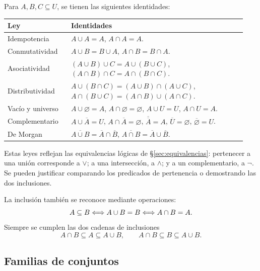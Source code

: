 Para $A,B,C\subseteq U$, se tienen las siguientes identidades:
\begin{center}
\small
\begin{tabular}{@{}p{0.25\linewidth}p{0.69\linewidth}@{}}
\toprule
Ley & Identidades\\
\midrule
Idempotencia & $A\cup A=A$, \quad $A\cap A=A$.\\[3pt]
Conmutatividad & $A\cup B=B\cup A$, \quad $A\cap B=B\cap A$.\\[3pt]
Asociatividad & $(A\cup B)\cup C=A\cup(B\cup C)$,\newline
               $(A\cap B)\cap C=A\cap(B\cap C)$.\\[3pt]
Distributividad & $A\cup(B\cap C)=(A\cup B)\cap(A\cup C)$,\newline
                 $A\cap(B\cup C)=(A\cap B)\cup(A\cap C)$.\\[3pt]
Vacío y universo & $A\cup\varnothing=A$, \quad $A\cap\varnothing=\varnothing$,\newline
                  $A\cup U=U$, \quad $A\cap U=A$.\\[3pt]
Complementario & $A\cup\overline A=U$, \quad $A\cap\overline A=\varnothing$,\newline
                $\overline{\overline A}=A$, \quad
                $\overline U=\varnothing$, \quad $\overline\varnothing=U$.\\[3pt]
De Morgan & $\overline{A\cup B}=\overline A\cap\overline B$,\newline
            $\overline{A\cap B}=\overline A\cup\overline B$.\\
\bottomrule
\end{tabular}
\end{center}
Estas leyes reflejan las equivalencias lógicas de
\S\ref{sec:equivalencias}: pertenecer a una unión corresponde a $\vee$;
a una intersección, a $\wedge$; y a un complementario, a $\neg$.
Se pueden justificar comparando los predicados de pertenencia o
demostrando las dos inclusiones.

La inclusión también se reconoce mediante operaciones:
\[
 A\subseteq B\Longleftrightarrow A\cup B=B\Longleftrightarrow A\cap B=A.
\]
Siempre se cumplen las dos cadenas de inclusiones
\[
 A\cap B\subseteq A\subseteq A\cup B,\qquad
 A\cap B\subseteq B\subseteq A\cup B.
\]

\subsection*{Familias de conjuntos}

